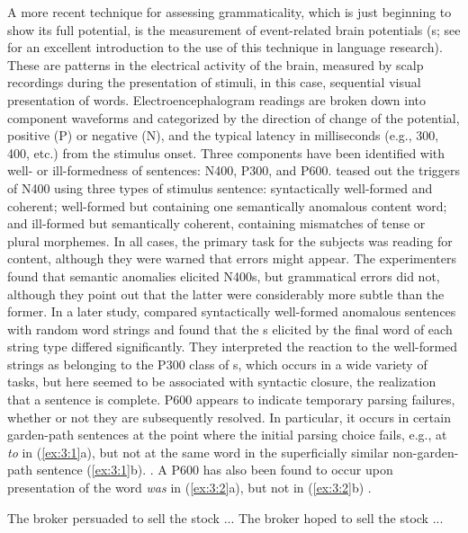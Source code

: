 A more recent technique for assessing grammaticality, which is just beginning to show its full potential, is the measurement of event-related brain potentials (s; see \citet{Garnsey1993} for an excellent introduction to the use of this technique in language research). These are patterns in the electrical activity of the brain, measured by scalp recordings during the presentation of stimuli, in this case, sequential visual presentation of words. Electroencephalogram readings are broken down into component waveforms and categorized by the direction of change of the potential, positive (P) or negative (N), and the typical latency in milliseconds (e.g., 300, 400, etc.) from the stimulus onset. Three  components have been identified with well- or ill-formedness of sentences: N400, P300, and P600. \citet{KutasEtAl1983} teased out the triggers of N400 using three types of stimulus sentence: syntactically well-formed and coherent; well-formed but containing one semantically anomalous content word; and ill-formed but semantically coherent, containing mismatches of tense or plural morphemes. In all cases, the primary task for the subjects was reading for content, although they
were warned that errors might appear. The experimenters found that semantic anomalies elicited N400s, but grammatical errors did not, although they point out that the latter were considerably more subtle than the former. In a later study,  \citet{VanPettenEtAl1991} compared syntactically well-formed anomalous sentences with random word strings and found that the s elicited by the final word of each string type differed significantly. They interpreted the reaction to the well-formed strings as belonging to the P300 class of s, which occurs in a wide variety of tasks, but here seemed to be associated with syntactic closure, the realization that a sentence is complete. P600 appears to indicate temporary parsing failures, whether or not they are subsequently resolved. In particular, it occurs in certain garden-path sentences at the point where the initial parsing choice fails, e.g., at \textit{to} in (\ref{ex:3:1}a), but not at the same word in the superficially similar non-garden-path sentence (\ref{ex:3:1}b).
\citep{OsterhoutEtAl1992}. A P600 has also been found to occur upon presentation of the word \textit{was} in (\ref{ex:3:2}a), but not in (\ref{ex:3:2}b) \citep{OsterhoutEtAl1994}.

\ea\label{ex:3:1}
\ea The broker persuaded to sell the stock ...
\ex The broker hoped to sell the stock ...
\z
\z

